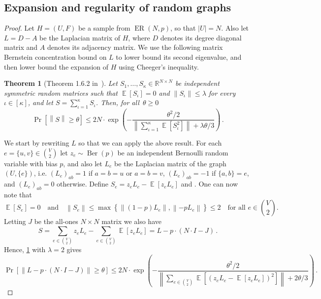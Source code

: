 \documentclass[epsfig,letter,11pt]{article}
\numberwithin{equation}{section}
\DeclareMathOperator{\ex}{\mathbb{E}}
\newcommand{\nm}[1]{\left\|#1\right\|}
\DeclareMathOperator*{\ber}{Ber}
\DeclareMathOperator*{\er}{ER}
\newtheorem{theorem}{Theorem}[section]
\begin{document}
\subsection{Expansion and regularity of random graphs}
\label{apndx:randomgraphs}
\erdos*
\begin{proof}
	Let $H=(U,F)$ be a sample from $\er(N,p)$, so that $|U|= N$. Also let $L=D-A$ be the Laplacian matrix of $H$, where $D$ denotes its degree diagonal matrix and $A$ denotes its adjacency matrix. We use the following matrix Bernstein concentration bound on $L$ to lower bound its second eigenvalue, and then lower bound the expansion of $H$ using Cheeger's inequality.
	\begin{theorem}[Theorem 1.6.2 in~\cite{matcon}]
		\label{th:bern} Let $S_1,\dots, S_\kappa \in \mathbb{R}^{N \times N}$ be independent symmetric random matrices such that $\ex[S_\iota]=0$ and $\nm{S_\iota} \le \lambda$ for every $\iota \in [\kappa]$, and let $S = \sum_{\iota=1}^{\kappa} S_\iota$. Then, for all~$\theta \ge 0$
		\begin{equation*}
			\Pr[\nm{S} \ge \theta] \le 2N \cdot \exp\left(-\frac{\theta^2/2}{\nm{ \sum_{\iota=1}^{\kappa} \ex[S_\iota^2]}+\lambda\theta/3}\right) \, .
		\end{equation*}
	\end{theorem}
	\noindent
	We start by rewriting $L$ so that we can apply the above result. For each $e=\{u,v\} \in \binom{V}{2}$ let $z_e \sim \ber(p)$ be an independent Bernoulli random variable with bias $p$, and also let $L_e $ be the Laplacian matrix of the graph $(U,\{e\})$, i.e. $(L_e)_{ab} = 1$ if $a=b=u$ or $a=b=v$, $(L_e)_{ab} = -1$ if $\{a,b\}=e$, and $(L_e)_{ab}=0$ otherwise. Define $S_e = z_e L_e - \ex[z_eL_e]$ and . One can now note that
	\begin{equation*}
		\ex[S_e]=0 \quad \text{and} \quad \nm{S_e} \le \max\left\{\nm{(1-p)L_e},\nm{-pL_e}\right\} \le 2\quad \text{for all $e\in \binom{V}{2}$.}
	\end{equation*}
	Letting $J$ be the all-ones $N \times N$ matrix we  also have
	\begin{equation*}
		S = \sum_{e \in \binom{V}{2}} z_e L_e - \sum_{e \in \binom{V}{2}} \ex[z_eL_e] = L- p \cdot (N \cdot I-J)\, .
	\end{equation*}
	Hence, \cref{th:bern} with $\lambda=2$ gives
	\begin{equation}
		\label{bern:appl}
		\Pr[\nm{L-p \cdot (N \cdot I-J)} \ge \theta] \le 2N \cdot \exp\left(-\frac{\theta^2/2}{\nm{ \sum_{e \in \binom{V}{2}} \ex[(z_e L_e - \ex[z_eL_e])^2]}+2\theta/3}\right) \,.

\end{equation}
\end{proof}
\end{document}
